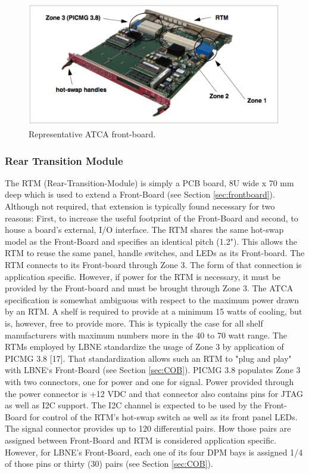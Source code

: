 \begin{figure}[tbh]
\includegraphics[scale=0.8]{front-boardpdf.pdf}
\caption{Representative ATCA front-board.}
\label{fig:frontBoard}
\end{figure} 

\subsubsection{Rear Transition Module}
\label{sec:rtm}
The RTM (Rear-Transition-Module) is simply a PCB board, 8U wide x 70 mm deep which is used to extend a Front-Board (see Section \ref{sec:frontboard}). Although not required, that extension is typically found necessary for two reasons: First, to increase the useful footprint of the Front-Board and second, to house a board's external, I/O interface. The RTM shares the same hot-swap model as the Front-Board and specifies an identical pitch (1.2"). This allows the RTM to reuse the same panel, handle switches, and LEDs as its Front-board. The RTM connects to its Front-board through Zone 3. The form of that connection is application specific. However, if power for the RTM is necessary, it must be provided by the Front-board and must be brought through Zone 3. The ATCA specification is somewhat ambiguous with respect to the maximum power drawn by an RTM. A shelf is required to provide at a minimum 15 watts of cooling, but is, however, free to provide more. This is typically the case for all shelf manufacturers with maximum numbers more in the 40 to 70 watt range.
The RTMs employed by LBNE standardize the usage of Zone 3 by application of PICMG 3.8 [17]. That standardization allows such an RTM to "plug and play" with LBNE‘s Front-Board (see Section \ref{sec:COB}). PICMG 3.8 populates Zone 3 with two connectors, one for power and one for signal. Power provided through the power connector is +12 VDC and that connector also contains pins for JTAG as well as I2C support. The I2C channel is expected to be used by the Front-Board for control of the RTM's hot-swap switch as well as its front panel LEDs.
The signal connector provides up to 120 differential pairs. How those pairs are assigned between Front-Board and RTM is considered application specific. However, for LBNE's Front-Board, each one of its four DPM bays is assigned 1/4 of those pins or thirty (30) pairs (see Section \ref{sec:COB}).

